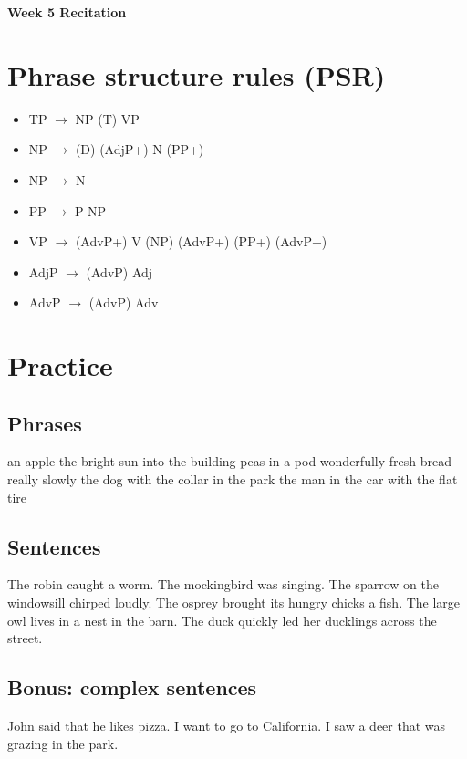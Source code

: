 \documentclass[a4paper,11pt]{article}
\begin{document}
\begin{center}
\Large{\textbf{Week 5 Recitation}}
\end{center}


\section{Phrase structure rules (PSR)}

\begin{itemize}
\item[] TP $\rightarrow$ NP (T) VP
\item[] NP $\rightarrow$ (D) (AdjP+) N (PP+)
\item[] NP $\rightarrow$ N 
\item[] PP $\rightarrow$ P NP
\item[] VP $\rightarrow$ (AdvP+) V (NP) (AdvP+) (PP+) (AdvP+)
\item[] AdjP $\rightarrow$ (AdvP) Adj
\item[] AdvP $\rightarrow$ (AdvP) Adv
\end{itemize}

\section{Practice}
\subsection{Phrases}

\begin{exe}
\ex an apple
\ex the bright sun
\ex into the building 
\ex peas in a pod
\ex wonderfully fresh bread
\ex really slowly
\ex the dog with the collar in the park
\ex the man in the car with the flat tire
\end{exe}

\subsection{Sentences}

\begin{exe}
\ex The robin caught a worm.
\ex The mockingbird was singing.
\ex The sparrow on the windowsill chirped loudly.
\ex The osprey brought its hungry chicks a fish.
\ex The large owl lives in a nest in the barn.
\ex The duck quickly led her ducklings across the street.
\end{exe}

\subsection{\textbf{Bonus:} complex sentences}

\begin{exe}
\ex John said that he likes pizza. 
\ex I want to go to California.
\ex I saw a deer that was grazing in the park. 
\end{exe}
\end{document}
